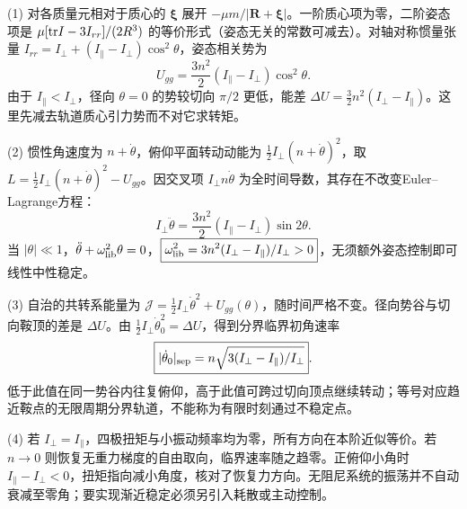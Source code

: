 (1) 对各质量元相对于质心的 \(\boldsymbol\xi\) 展开 \(-\mu m/|\boldsymbol R+\boldsymbol\xi|\)。一阶质心项为零，二阶姿态项是
\(\mu[{\rm tr}I-3I_{rr}]/(2R^3)\) 的等价形式（姿态无关的常数可减去）。对轴对称惯量张量 \(I_{rr}=I_\perp+(I_\parallel-I_\perp)\cos^2\theta\)，姿态相关势为
\[
\boxed{U_{gg}=\frac{3n^2}{2}(I_\parallel-I_\perp)\cos^2\theta}.
\]
由于 \(I_\parallel<I_\perp\)，径向 \(\theta=0\) 的势较切向 \(\pi/2\) 更低，能差 \(\Delta U=\frac32n^2(I_\perp-I_\parallel)\)。这里先减去轨道质心引力势而不对它求转矩。

(2) 惯性角速度为 \(n+\dot\theta\)，俯仰平面转动动能为 \(\frac12I_\perp(n+\dot\theta)^2\)，取
\(L=\frac12I_\perp(n+\dot\theta)^2-U_{gg}\)。因交叉项 \(I_\perp n\dot\theta\) 为全时间导数，其存在不改变Euler–Lagrange方程：
\[
I_\perp\ddot\theta=\frac{3n^2}{2}(I_\parallel-I_\perp)\sin2\theta .
\]
当 \(|\theta|\ll1\)，\(\ddot\theta+\omega_{\rm lib}^2\theta=0\)，\(\boxed{\omega_{\rm lib}^2=3n^2(I_\perp-I_\parallel)/I_\perp>0}\)，无须额外姿态控制即可线性中性稳定。

(3) 自治的共转系能量为 \(\mathcal J=\frac12I_\perp\dot\theta^2+U_{gg}(\theta)\)，随时间严格不变。径向势谷与切向鞍顶的差是 \(\Delta U\)。由 \(\frac12I_\perp\dot\theta_0^2=\Delta U\)，得到分界临界初角速率
\[
\boxed{|\dot\theta_0|_{\rm sep}=n\sqrt{3(I_\perp-I_\parallel)/I_\perp}}.
\]
低于此值在同一势谷内往复俯仰，高于此值可跨过切向顶点继续转动；等号对应趋近鞍点的无限周期分界轨道，不能称为有限时刻通过不稳定点。

(4) 若 \(I_\perp=I_\parallel\)，四极扭矩与小振动频率均为零，所有方向在本阶近似等价。若 \(n\to0\) 则恢复无重力梯度的自由取向，临界速率随之趋零。正俯仰小角时 \(I_\parallel-I_\perp<0\)，扭矩指向减小角度，核对了恢复力方向。无阻尼系统的振荡并不自动衰减至零角；要实现渐近稳定必须另引入耗散或主动控制。
